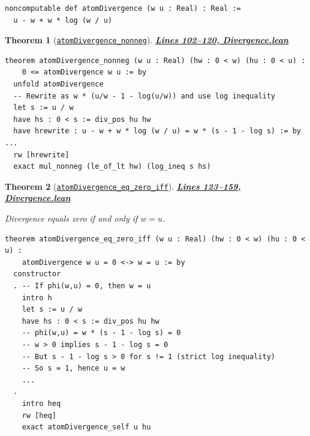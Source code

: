\documentclass[11pt]{article}
\newtheorem{theorem}{Theorem}[section]
\theoremstyle{definition}
\theoremstyle{remark}
\begin{document}
\begin{lstlisting}[caption={Atom divergence}]
noncomputable def atomDivergence (w u : Real) : Real :=
  u - w + w * log (w / u)
\end{lstlisting}

\begin{theorem}[\href{https://github.com/zariuq/ks-foundations-of-inference/blob/main/KnuthSkilling/Information/Divergence.lean\#L102}{\texttt{atomDivergence\_nonneg}}]
\textbf{\href{https://github.com/zariuq/ks-foundations-of-inference/blob/main/KnuthSkilling/Information/Divergence.lean\#L102-L120}{Lines 102--120, Divergence.lean}}
\end{theorem}

\begin{lstlisting}[caption={Divergence non-negativity}]
theorem atomDivergence_nonneg (w u : Real) (hw : 0 < w) (hu : 0 < u) :
    0 <= atomDivergence w u := by
  unfold atomDivergence
  -- Rewrite as w * (u/w - 1 - log(u/w)) and use log inequality
  let s := u / w
  have hs : 0 < s := div_pos hu hw
  have hrewrite : u - w + w * log (w / u) = w * (s - 1 - log s) := by ...
  rw [hrewrite]
  exact mul_nonneg (le_of_lt hw) (log_ineq s hs)
\end{lstlisting}

\begin{theorem}[\href{https://github.com/zariuq/ks-foundations-of-inference/blob/main/KnuthSkilling/Information/Divergence.lean\#L123}{\texttt{atomDivergence\_eq\_zero\_iff}}]
\textbf{\href{https://github.com/zariuq/ks-foundations-of-inference/blob/main/KnuthSkilling/Information/Divergence.lean\#L123-L159}{Lines 123--159, Divergence.lean}}

Divergence equals zero if and only if $w = u$.
\end{theorem}

\begin{lstlisting}[caption={Divergence equals zero iff $w = u$ (\href{https://github.com/zariuq/ks-foundations-of-inference/blob/main/KnuthSkilling/Information/Divergence.lean\#L123}{Divergence.lean:123})},numbers=none]
theorem atomDivergence_eq_zero_iff (w u : Real) (hw : 0 < w) (hu : 0 < u) :
    atomDivergence w u = 0 <-> w = u := by
  constructor
  . -- If phi(w,u) = 0, then w = u
    intro h
    let s := u / w
    have hs : 0 < s := div_pos hu hw
    -- phi(w,u) = w * (s - 1 - log s) = 0
    -- w > 0 implies s - 1 - log s = 0
    -- But s - 1 - log s > 0 for s != 1 (strict log inequality)
    -- So s = 1, hence u = w
    ...
  .
    intro heq
    rw [heq]
    exact atomDivergence_self u hu
\end{lstlisting}
\end{document}
